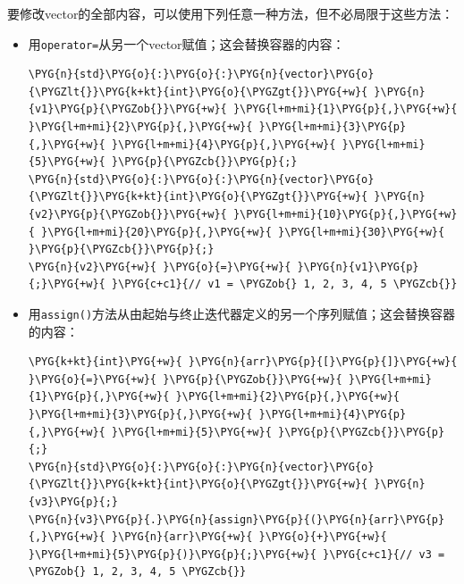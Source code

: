 
要修改vector的全部内容，可以使用下列任意一种方法，但不必局限于这些方法：



\begin{itemize}
\item 用\texttt{operator=}从另一个vector赋值；这会替换容器的内容：



\begin{codeblockbg}
\begin{Verbatim}[commandchars=\\\{\},breaklines=true,breakanywhere=true,fontsize=\codefont,xleftmargin=17bp]
\PYG{n}{std}\PYG{o}{:}\PYG{o}{:}\PYG{n}{vector}\PYG{o}{\PYGZlt{}}\PYG{k+kt}{int}\PYG{o}{\PYGZgt{}}\PYG{+w}{ }\PYG{n}{v1}\PYG{p}{\PYGZob{}}\PYG{+w}{ }\PYG{l+m+mi}{1}\PYG{p}{,}\PYG{+w}{ }\PYG{l+m+mi}{2}\PYG{p}{,}\PYG{+w}{ }\PYG{l+m+mi}{3}\PYG{p}{,}\PYG{+w}{ }\PYG{l+m+mi}{4}\PYG{p}{,}\PYG{+w}{ }\PYG{l+m+mi}{5}\PYG{+w}{ }\PYG{p}{\PYGZcb{}}\PYG{p}{;}
\PYG{n}{std}\PYG{o}{:}\PYG{o}{:}\PYG{n}{vector}\PYG{o}{\PYGZlt{}}\PYG{k+kt}{int}\PYG{o}{\PYGZgt{}}\PYG{+w}{ }\PYG{n}{v2}\PYG{p}{\PYGZob{}}\PYG{+w}{ }\PYG{l+m+mi}{10}\PYG{p}{,}\PYG{+w}{ }\PYG{l+m+mi}{20}\PYG{p}{,}\PYG{+w}{ }\PYG{l+m+mi}{30}\PYG{+w}{ }\PYG{p}{\PYGZcb{}}\PYG{p}{;}
\PYG{n}{v2}\PYG{+w}{ }\PYG{o}{=}\PYG{+w}{ }\PYG{n}{v1}\PYG{p}{;}\PYG{+w}{ }\PYG{c+c1}{// v1 = \PYGZob{} 1, 2, 3, 4, 5 \PYGZcb{}}
\end{Verbatim}
\end{codeblockbg}



\item 用\texttt{assign()}方法从由起始与终止迭代器定义的另一个序列赋值；这会替换容器的内容：



\begin{codeblockbg}
\begin{Verbatim}[commandchars=\\\{\},breaklines=true,breakanywhere=true,fontsize=\codefont,xleftmargin=17bp]
\PYG{k+kt}{int}\PYG{+w}{ }\PYG{n}{arr}\PYG{p}{[}\PYG{p}{]}\PYG{+w}{ }\PYG{o}{=}\PYG{+w}{ }\PYG{p}{\PYGZob{}}\PYG{+w}{ }\PYG{l+m+mi}{1}\PYG{p}{,}\PYG{+w}{ }\PYG{l+m+mi}{2}\PYG{p}{,}\PYG{+w}{ }\PYG{l+m+mi}{3}\PYG{p}{,}\PYG{+w}{ }\PYG{l+m+mi}{4}\PYG{p}{,}\PYG{+w}{ }\PYG{l+m+mi}{5}\PYG{+w}{ }\PYG{p}{\PYGZcb{}}\PYG{p}{;}
\PYG{n}{std}\PYG{o}{:}\PYG{o}{:}\PYG{n}{vector}\PYG{o}{\PYGZlt{}}\PYG{k+kt}{int}\PYG{o}{\PYGZgt{}}\PYG{+w}{ }\PYG{n}{v3}\PYG{p}{;}
\PYG{n}{v3}\PYG{p}{.}\PYG{n}{assign}\PYG{p}{(}\PYG{n}{arr}\PYG{p}{,}\PYG{+w}{ }\PYG{n}{arr}\PYG{+w}{ }\PYG{o}{+}\PYG{+w}{ }\PYG{l+m+mi}{5}\PYG{p}{)}\PYG{p}{;}\PYG{+w}{ }\PYG{c+c1}{// v3 = \PYGZob{} 1, 2, 3, 4, 5 \PYGZcb{}}
\end{Verbatim}
\end{codeblockbg}



\end{itemize}
